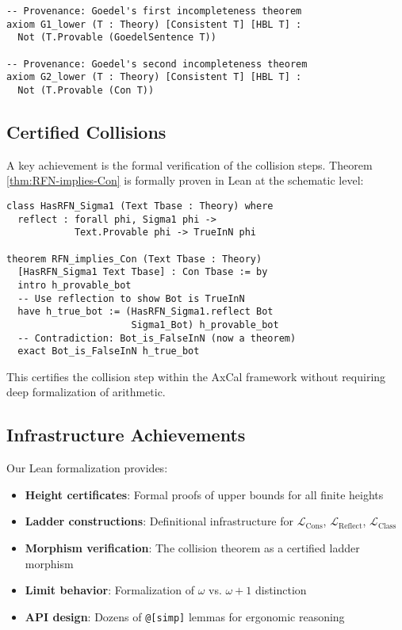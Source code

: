 \documentclass[11pt]{article}
\newcommand{\LCons}{\mathcal{L}_{\mathrm{Cons}}}
\newcommand{\LReflect}{\mathcal{L}_{\mathrm{Reflect}}}
\newcommand{\LClass}{\mathcal{L}_{\mathrm{Class}}}
\begin{document}
\begin{lstlisting}[language=Lean, caption={Named Classical Axioms}]
-- Provenance: Goedel's first incompleteness theorem
axiom G1_lower (T : Theory) [Consistent T] [HBL T] :
  Not (T.Provable (GoedelSentence T))

-- Provenance: Goedel's second incompleteness theorem  
axiom G2_lower (T : Theory) [Consistent T] [HBL T] :
  Not (T.Provable (Con T))
\end{lstlisting}

\subsection{Certified Collisions}
A key achievement is the formal verification of the collision steps. Theorem \ref{thm:RFN-implies-Con} is formally proven in Lean at the schematic level:

\begin{lstlisting}[language=Lean, caption={Schematic Proof of RFN implies Con}]
class HasRFN_Sigma1 (Text Tbase : Theory) where
  reflect : forall phi, Sigma1 phi -> 
            Text.Provable phi -> TrueInN phi

theorem RFN_implies_Con (Text Tbase : Theory) 
  [HasRFN_Sigma1 Text Tbase] : Con Tbase := by
  intro h_provable_bot
  -- Use reflection to show Bot is TrueInN
  have h_true_bot := (HasRFN_Sigma1.reflect Bot 
                      Sigma1_Bot) h_provable_bot
  -- Contradiction: Bot_is_FalseInN (now a theorem)
  exact Bot_is_FalseInN h_true_bot
\end{lstlisting}

This certifies the collision step within the AxCal framework without requiring deep formalization of arithmetic.

\subsection{Infrastructure Achievements}
Our Lean formalization provides:
\begin{itemize}
\item \textbf{Height certificates}: Formal proofs of upper bounds for all finite heights
\item \textbf{Ladder constructions}: Definitional infrastructure for $\LCons$, $\LReflect$, $\LClass$
\item \textbf{Morphism verification}: The collision theorem as a certified ladder morphism
\item \textbf{Limit behavior}: Formalization of $\omega$ vs. $\omega+1$ distinction
\item \textbf{API design}: Dozens of \texttt{@[simp]} lemmas for ergonomic reasoning
\end{itemize}
\end{document}
